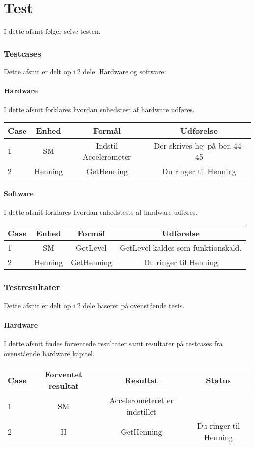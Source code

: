 \chapter{Test}
I dette afsnit følger selve testen.
\subsection{Testcases}
Dette afsnit er delt op i  2 dele. Hardware og software:\\
\subsubsection{Hardware}
I dette afsnit forklares hvordan enhedstest af hardware udføres.
\begin{table}[htbp]
\centering
\begin{tabular}{| l  | c | c | c |}
\hline
Case &Enhed &Formål &Udførelse\\\hline
1 &SM &Indstil Accelerometer &Der skrives hej på ben 44-45\\\hline
2 &Henning &GetHenning &Du ringer til Henning\\\hline
\end{tabular}
\end{table}
\subsubsection{Software}
I dette afsnit forklares hvordan enhedstests af hardware udføres.
\begin{table}[htbp]
\centering
\begin{tabular}{| l  | c | c | c |}
\hline
Case &Enhed &Formål &Udførelse\\\hline
1 &SM &GetLevel &GetLevel kaldes som funktionskald.\\\hline
2 &Henning &GetHenning &Du ringer til Henning\\\hline
\end{tabular}
\end{table}
\subsection{Testresultater}
Dette afsnit er delt op i  2 dele baseret på ovenstående tests.\\
\subsubsection{Hardware}
I dette afsnit findes forventede resultater samt resultater på testcases fra ovenstående hardware kapitel.\\
\begin{table}[htbp]
\centering
\begin{tabular}{| l  | c | c | c |}
\hline
Case &Forventet resultat &Resultat &Status\\\hline
1 &SM &Accelerometeret er indstillet & \\\hline
2 &H &GetHenning &Du ringer til Henning\\\hline
\end{tabular}
\end{table}

